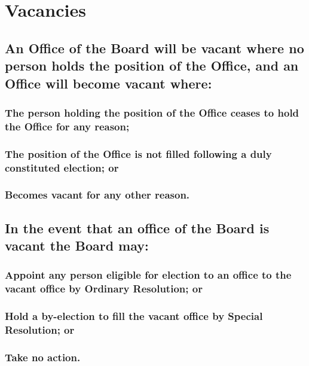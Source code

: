\documentclass{article}
\newenvironment{subs}
  {\adjustwidth{2em}{0pt}}
  {\endadjustwidth}
\begin{document}
\section{Vacancies}
\begin{subs}
\subsection{An Office of the Board will be vacant where no person holds the position of the Office, and an Office will become vacant where:}
\begin{subs}
\subsubsection{The person holding the position of the Office ceases to hold the Office for any reason;}
\subsubsection{The position of the Office is not filled following a duly constituted election; or}
\subsubsection{Becomes vacant for any other reason.}
\end{subs}
\subsection{In the event that an office of the Board is vacant the Board may: }
\begin{subs}
\subsubsection{Appoint any person eligible for election to an office to the vacant office by Ordinary Resolution; or}
\subsubsection{Hold a by-election to fill the vacant office by Special Resolution; or}
\subsubsection{Take no action.}
\end{subs}
\end{subs}
\newpage
\end{document}
